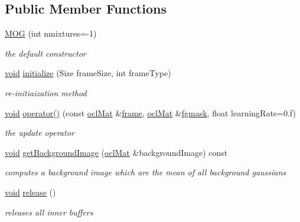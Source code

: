 \subsection*{Public Member Functions}
\begin{DoxyCompactItemize}
\item 
\hyperlink{classcv_1_1ocl_1_1MOG_a460cd25b57fd4690b496deb342f414ed}{M\-O\-G} (int nmixtures=-\/1)
\begin{DoxyCompactList}\small\item\em the default constructor \end{DoxyCompactList}\item 
\hyperlink{legacy_8hpp_a8bb47f092d473522721002c86c13b94e}{void} \hyperlink{classcv_1_1ocl_1_1MOG_aacbf6a989c9ba1a0594f20192085533b}{initialize} (Size frame\-Size, int frame\-Type)
\begin{DoxyCompactList}\small\item\em re-\/initiaization method \end{DoxyCompactList}\item 
\hyperlink{legacy_8hpp_a8bb47f092d473522721002c86c13b94e}{void} \hyperlink{classcv_1_1ocl_1_1MOG_a501fb6247c1cf49c085fa8875d692b40}{operator()} (const \hyperlink{classcv_1_1ocl_1_1oclMat}{ocl\-Mat} \&\hyperlink{core__c_8h_a0430deaafd9043e478f306e33961299d}{frame}, \hyperlink{classcv_1_1ocl_1_1oclMat}{ocl\-Mat} \&\hyperlink{legacy_8hpp_a7ff9edf5eaa300d3c1cea7de20631fd8}{fgmask}, float learning\-Rate=0.f)
\begin{DoxyCompactList}\small\item\em the update operator \end{DoxyCompactList}\item 
\hyperlink{legacy_8hpp_a8bb47f092d473522721002c86c13b94e}{void} \hyperlink{classcv_1_1ocl_1_1MOG_a3162d8e7ee2e3479ef0f48eab4d8fbc7}{get\-Background\-Image} (\hyperlink{classcv_1_1ocl_1_1oclMat}{ocl\-Mat} \&background\-Image) const 
\begin{DoxyCompactList}\small\item\em computes a background image which are the mean of all background gaussians \end{DoxyCompactList}\item 
\hyperlink{legacy_8hpp_a8bb47f092d473522721002c86c13b94e}{void} \hyperlink{classcv_1_1ocl_1_1MOG_a90ab5e3e0558ac902cf35f514f53e569}{release} ()
\begin{DoxyCompactList}\small\item\em releases all inner buffers \end{DoxyCompactList}\end{DoxyCompactItemize}
